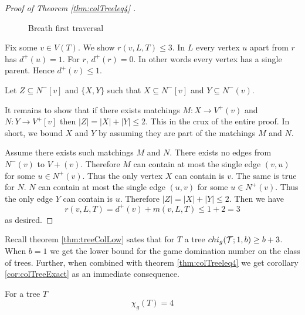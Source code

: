 \begin{proof}[Proof of Theorem \ref{thm:colTreeleq4} \cite{KIERSTEAD2000}]
\begin{figure}[h]
        \caption{Breath first traversal}
        \label{fig:BFT}
    \end{figure}
    Fix some $v\in V(T)$. We show $r(v,L,T)\leq 3$. In $L$ every vertex $u$ apart from $r$ has $d^+(u) = 1$. For $r$, $d^+(r) = 0$. In other words every vertex has a single parent. Hence $d^+(v)\leq 1$.
    
    Let $Z\subseteq N^-[v]$ and $\{X,Y\}$ such that $X\subseteq N^-[v]$ and $Y\subseteq N^-(v)$. 
    
    It remains to show that if there exists matchings $M:X\to V^+(v)$ and $N:Y\to V^+[v]$ then $|Z| = |X|+|Y| \leq 2$. This in the crux of the entire proof. In short, we bound $X$ and $Y$ by assuming they are part of the matchings $M$ and $N$.
    
    Assume there exists such matchings $M$ and $N$. There exists no edges from $N^-(v)$ to $V+(v)$. Therefore $M$ can contain at most the single edge $(v,u)$ for some $u\in N^+(v)$. Thus the only vertex $X$ can contain is $v$.    
    The same is true for $N$. $N$ can contain at most the single edge $(u,v)$ for some $u\in N^+(v)$. Thus the only edge $Y$ can contain is $u$. Therefore $|Z| = |X|+|Y|\leq 2$.    
    Then we have \[r(v,L,T) = d^+(v)+m(v,L,T) \leq 1 + 2 =3\] as desired.
\end{proof}

Recall theorem \ref{thm:treeColLow} sates that for $T$ a tree $chi_g(\mathcal{T};1,b) \geq b+3 $. When $b=1$ we get the lower bound for the game domination number on the class of trees. Further, when combined with theorem \ref{thm:colTreeleq4} we get corollary \ref{cor:colTreeExact} as an immediate consequence.  

\begin{corollary} \label{cor:colTreeExact}
    For a tree $T$ \[\chi_g(T) = 4\]
\end{corollary}

